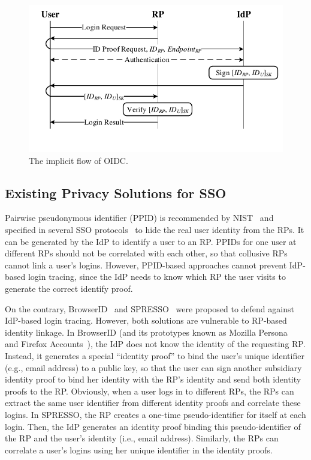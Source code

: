 \begin{figure}[t]
  \centering
  \includegraphics[width=0.9\linewidth]{fig/OIDC1.pdf}
  \caption{The implicit flow of OIDC.}
  \label{fig:OpenID}
  \vspace{-5mm}
\end{figure}

\subsection{Existing Privacy Solutions for SSO}
\label{subsec-solutions}
Pairwise pseudonymous identifier (PPID) is recommended by NIST~\cite{NIST2017draft} and specified in several SSO protocols~\cite{OpenIDConnect, SAMLIdentifier} to hide the real user identity from the RPs. It can be generated by the IdP to identify a user to an RP. PPIDs for one user at different RPs should not be correlated with each other, so that collusive RPs cannot link a user's logins. However, PPID-based approaches cannot prevent IdP-based login tracing, since the IdP needs to know which RP the user visits to generate the correct identify proof. 

On the contrary, BrowserID~\cite{BrowserID} and SPRESSO~\cite{SPRESSO} were proposed to defend against IdP-based login tracing. However, both solutions are vulnerable to RP-based identity linkage. In BrowserID (and its prototypes known as Mozilla Persona~\cite{persona} and Firefox Accounts~\cite{FirefoxAccount}), the IdP does not know the identity of the requesting RP. Instead, it generates a special ``identity proof'' to bind the user's unique identifier (e.g., email address) to a public key, so that the user can sign another subsidiary identity proof to bind her identity with the RP's identity and send both identity proofs to the RP. Obviously, when a user logs in to different RPs, the RPs can extract the same user identifier from different identity proofs and correlate these logins. In SPRESSO, the RP creates a one-time pseudo-identifier for itself at each login. Then, the IdP generates an identity proof binding this pseudo-identifier of the RP and the user's identity (i.e., email address). %
Similarly, the RPs can correlate a user's logins using her unique identifier in the identity proofs.

